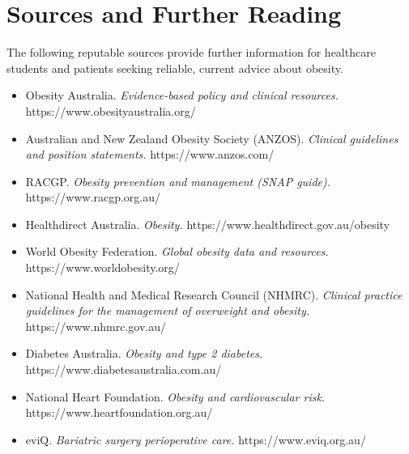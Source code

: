 \section*{Sources and Further Reading}
The following reputable sources provide further information for healthcare students and patients seeking reliable, current advice about obesity.

\begin{itemize}
    \item Obesity Australia. \textit{Evidence-based policy and clinical resources.} https://www.obesityaustralia.org/
    \item Australian and New Zealand Obesity Society (ANZOS). \textit{Clinical guidelines and position statements.} https://www.anzos.com/
    \item RACGP. \textit{Obesity prevention and management (SNAP guide).} https://www.racgp.org.au/
    \item Healthdirect Australia. \textit{Obesity.} https://www.healthdirect.gov.au/obesity
    \item World Obesity Federation. \textit{Global obesity data and resources.} https://www.worldobesity.org/
    \item National Health and Medical Research Council (NHMRC). \textit{Clinical practice guidelines for the management of overweight and obesity.} https://www.nhmrc.gov.au/
    \item Diabetes Australia. \textit{Obesity and type 2 diabetes.} https://www.diabetesaustralia.com.au/
    \item National Heart Foundation. \textit{Obesity and cardiovascular risk.} https://www.heartfoundation.org.au/
    \item eviQ. \textit{Bariatric surgery perioperative care.} https://www.eviq.org.au/
\end{itemize}